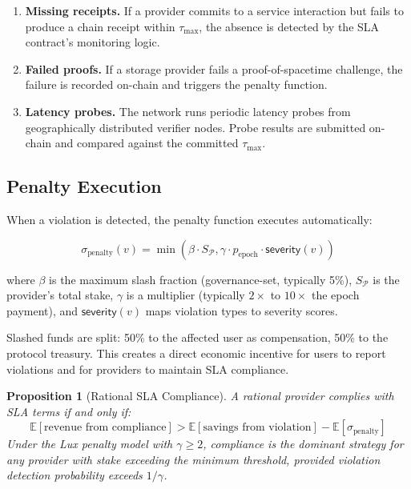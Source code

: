 \documentclass[11pt,a4paper]{article}
\newtheorem{proposition}[theorem]{Proposition}
\begin{document}
\begin{enumerate}
    \item \textbf{Missing receipts.} If a provider commits to a service
    interaction but fails to produce a chain receipt within $\tau_{\max}$,
    the absence is detected by the SLA contract's monitoring logic.

    \item \textbf{Failed proofs.} If a storage provider fails a
    proof-of-spacetime challenge, the failure is recorded on-chain and
    triggers the penalty function.

    \item \textbf{Latency probes.} The network runs periodic latency probes
    from geographically distributed verifier nodes. Probe results are
    submitted on-chain and compared against the committed $\tau_{\max}$.
\end{enumerate}

\subsection{Penalty Execution}

When a violation is detected, the penalty function executes automatically:

\begin{equation}\label{eq:penalty}
    \sigma_{\text{penalty}}(v) = \min\left(\beta \cdot S_{\mathcal{P}}, \gamma \cdot p_{\text{epoch}} \cdot \mathsf{severity}(v)\right)
\end{equation}

where $\beta$ is the maximum slash fraction (governance-set, typically 5\%),
$S_{\mathcal{P}}$ is the provider's total stake, $\gamma$ is a multiplier
(typically $2\times$ to $10\times$ the epoch payment), and $\mathsf{severity}(v)$
maps violation types to severity scores.

Slashed funds are split: 50\% to the affected user as compensation, 50\% to
the protocol treasury. This creates a direct economic incentive for users to
report violations and for providers to maintain SLA compliance.

\begin{proposition}[Rational SLA Compliance]
A rational provider complies with SLA terms if and only if:
\begin{equation}
    \mathbb{E}[\text{revenue from compliance}] > \mathbb{E}[\text{savings from violation}] - \mathbb{E}[\sigma_{\text{penalty}}]
\end{equation}
Under the Lux penalty model with $\gamma \geq 2$, compliance is the dominant
strategy for any provider with stake exceeding the minimum threshold, provided
violation detection probability exceeds $1/\gamma$.
\end{proposition}
\end{document}
